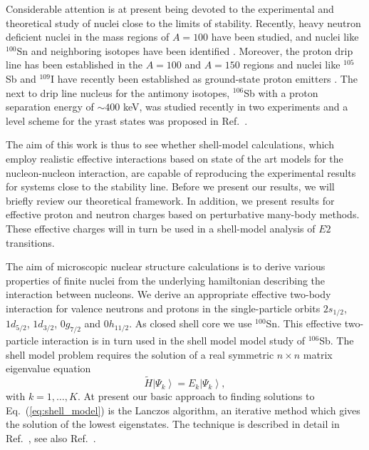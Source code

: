 \begin{multicols}{2}
Considerable attention is at present being devoted to the
experimental and theoretical study of nuclei close to the limits
of stability. Recently, heavy neutron deficient nuclei in the mass
regions of $A=100$ have been studied, and nuclei like $^{100}$Sn
and neighboring isotopes have been identified \cite{sn100a,sn100b,sn100c}.
Moreover, the proton drip line has been established in the $A=100$
and $A=150$ regions \cite{protondripline} and nuclei like
$^{105}$Sb and $^{109}$I have recently  been established as  ground-state 
proton emitters \cite{sb105,i109}.
The next to drip line nucleus for the antimony isotopes, $^{106}$Sb
with a proton separation energy of $\sim 400$ keV, was studied recently
in two experiments and a level scheme for the yrast states was proposed
in Ref.~\cite{sb106}.

The aim of this work is thus to see whether shell-model calculations,
which
employ realistic effective interactions based on state of the art 
models for the nucleon-nucleon interaction,  
are capable of reproducing
the experimental results for systems close to the stability line.
Before we present  our results, we will briefly 
review  our theoretical framework.
In addition, we present results
for effective proton and neutron charges based on perturbative
many-body methods. These effective charges will in turn
be used in a shell-model analysis of $E2$ transitions.

The aim of microscopic nuclear structure calculations is to derive
various properties of finite nuclei from the underlying 
hamiltonian describing the interaction between 
nucleons. 
We derive an appropriate 
effective two-body interaction for valence neutrons and protons  in the 
single-particle orbits $2s_{1/2}$, $1d_{5/2}$, $1d_{3/2}$, 
$0g_{7/2}$ and $0h_{11/2}$. As closed shell core we use $^{100}$Sn.
This effective two-particle interaction is in turn used in the 
shell model model study of $^{106}$Sb.
The shell model problem requires the solution of a real symmetric
$n \times n$ matrix eigenvalue equation
\begin{equation}
       \tilde{H}\left | \Psi_k\right\rangle  = 
       E_k \left | \Psi_k\right\rangle ,
       \label{eq:shell_model}
\end{equation}
with $k = 1,\ldots, K$. 
At present our basic approach to 
finding solutions to Eq.\ (\ref{eq:shell_model})
is the Lanczos algorithm, an iterative method which gives the solution of
the lowest eigenstates. The 
technique is described in detail in Ref.\ \cite{whit77}, 
see also Ref.\ \cite{ehho95}. 


\end{multicols}
